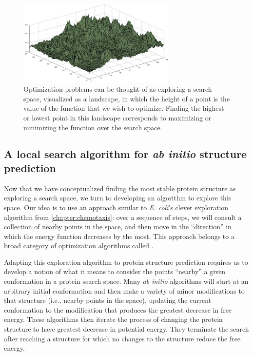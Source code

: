 \begin{figure}[h]
	\centering
	\mySfFamily
	\includegraphics[width = 0.7\textwidth]{../images/energy_landscape.png}
	\caption{Optimization problems can be thought of as exploring a search space, visualized as a landscape, in which the height of a point is the value of the function that we wish to optimize. Finding the highest or lowest point in this landscape corresponds to maximizing or minimizing the function over the search space.}
	\label{fig:energy_landscape}
\end{figure}

\FloatBarrier
{}
\subsection{A local search algorithm for \textit{ab initio} structure prediction}

Now that we have conceptualized finding the most stable protein structure as exploring a search space, we turn to developing an algorithm to explore this space. Our idea is to use an approach similar to \textit{E. coli}'s clever exploration algorithm from \autoref{chapter:chemotaxis}: over a sequence of steps, we will consult a collection of nearby points in the space, and then move in the ``direction'' in which the energy function decreases by the most. This approach belongs to a broad category of optimization algorithms called .

Adapting this exploration algorithm to protein structure prediction requires us to develop a notion of what it means to consider the points ``nearby'' a given conformation in a protein search space. Many \textit{ab initio} algorithms will start at an arbitrary initial conformation and then make a variety of minor modifications to that structure (i.e., nearby points in the space), updating the current conformation to the modification that produces the greatest decrease in free energy. These algorithms then iterate the process of changing the protein structure to have greatest decrease in potential energy. They terminate the search after reaching a structure for which no changes to the structure reduce the free energy.

